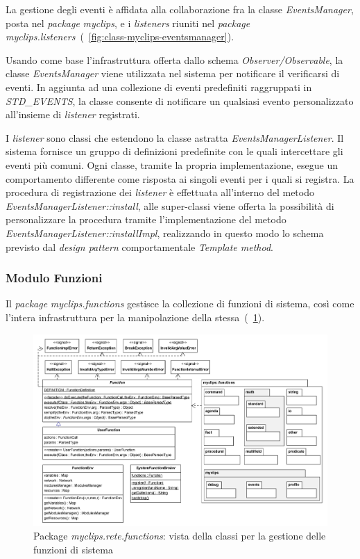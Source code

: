 La gestione degli eventi è affidata alla collaborazione fra la classe \emph{EventsManager}, posta nel \emph{package} \emph{myclips}, e i \emph{listeners} riuniti nel \emph{package} \emph{myclips.listeners}~(\figurename~\ref{fig:class-myclips-eventsmanager}).

Usando come base l'infrastruttura offerta dallo schema \emph{Observer/Observable}, la classe \emph{EventsManager} viene utilizzata nel sistema per notificare il verificarsi di eventi. In aggiunta ad una collezione di eventi predefiniti raggruppati in \emph{STD\_EVENTS}, la classe consente di notificare un qualsiasi evento personalizzato all'insieme di \emph{listener} registrati.

I \emph{listener} sono classi che estendono la classe astratta \emph{EventsManagerListener}. Il sistema fornisce un gruppo di definizioni predefinite con le quali intercettare gli eventi più comuni. Ogni classe, tramite la propria implementazione, esegue un comportamento differente come risposta ai singoli eventi per i quali si registra. La procedura di registrazione dei \emph{listener} è effettuata all'interno del metodo \emph{EventsManagerListener::install}, alle super-classi viene offerta la possibilità di personalizzare la procedura tramite l'implementazione del metodo \emph{EventsManagerListener::installImpl}, realizzando in questo modo lo schema previsto dal \emph{design pattern} comportamentale \emph{Template method}.

\subsubsection{Modulo Funzioni}
Il \emph{package} \emph{myclips.functions} gestisce la collezione di funzioni di sistema, così come l'intera infrastruttura per la manipolazione della stessa~(\figurename~\ref{fig:class-myclips-functions}).

\begin{figure}
\centering
\includegraphics[width=1.3\textwidth, angle=270]{Immagini/Capitolo3/Classi/myclips_functions-Globale.png}
\caption{Package \emph{myclips.rete.functions}: vista della classi per la gestione delle funzioni di sistema}\label{fig:class-myclips-functions}
\end{figure}


